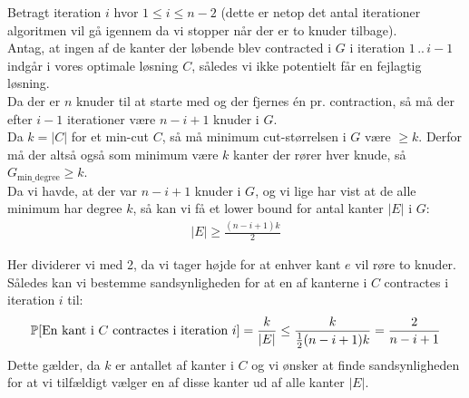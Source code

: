 Betragt iteration $i$ hvor $1 \leq i \leq n-2$ (dette er netop det antal iterationer algoritmen vil gå igennem da vi stopper når der er to knuder tilbage).\\


Antag, at ingen af de kanter der løbende blev contracted i $G$ i iteration $1 \, .. \, i-1$  indgår i vores optimale løsning $C$, således vi ikke potentielt får en fejlagtig løsning.\\

Da der er $n$ knuder til at starte med og der fjernes én pr. contraction, så må der efter $i-1$ iterationer være $n-i+1$ knuder i $G$.\\

Da $k = |C|$ for et min-cut $C$, så må minimum cut-størrelsen i $G$ være $\geq k$. Derfor må der altså også som minimum være $k$ kanter der rører hver knude, så $G_{\text{min\_degree}} \geq k$.\\

Da vi havde, at der var $n-i+1$ knuder i $G$, og vi lige har vist at de alle minimum har degree $k$, så kan vi få et lower bound for antal kanter $|E|$ i $G$:
\begin{align}
|E| \geq \frac{(n-i+1)k}{2}
\end{align}

Her dividerer vi med 2, da vi tager højde for at enhver kant $e$ vil røre to knuder.\\

Således kan vi bestemme sandsynligheden for at en af kanterne i $C$ contractes i iteration $i$ til:
\begin{align}
\P[\text{En kant i $C$ contractes i iteration $i$}] = \frac{k}{|E|} \leq \frac{k}{\frac{1}{2}(n-i+1)k} = \frac{2}{n-i+1}
\end{align}
Dette gælder, da $k$ er antallet af kanter i $C$ og vi ønsker at finde sandsynligheden for at vi tilfældigt vælger en af disse kanter ud af alle kanter $|E|$.